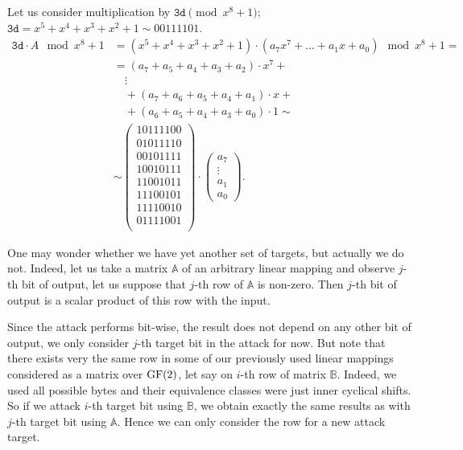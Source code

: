 \begin{example}
\label{ex:shiftmatrix}
	Let us consider multiplication by $\texttt{3d}\pmod{x^8+1}$; $\texttt{3d} = x^5+x^4+x^3+x^2+1 \sim 00111101$.
	\begin{align*}
		\texttt{3d} \cdot A \mod{x^8+1} &= (x^5+x^4+x^3+x^2+1) \cdot (a_7x^7+\ldots+a_1x+a_0) \mod{x^8+1} = \\
		&= (a_7+a_5+a_4+a_3+a_2)\cdot x^7 + ~\\
		&\quad\vdots \\
		&\quad + (a_7+a_6+a_5+a_4+a_1)\cdot x + ~\\
		&\quad + (a_6+a_5+a_4+a_3+a_0)\cdot 1 \sim \\
		&\sim
		\begin{pmatrix}
			10111100 \\
			01011110 \\
			00101111 \\
			10010111 \\
			11001011 \\
			11100101 \\
			11110010 \\
			01111001 \\
		\end{pmatrix}
		\cdot
		\begin{pmatrix}
			a_7 \\ \vdots \\ a_1 \\ a_0
		\end{pmatrix}.
	\end{align*}
\end{example}

One may wonder whether we have yet another set of targets, but actually we do not. Indeed, let us take a matrix $\mathbb{A}$ of an arbitrary linear mapping and observe $j$-th bit of output, let us suppose that $j$-th row of $\mathbb{A}$ is non-zero. Then $j$-th bit of output is a scalar product of this row with the input.

Since the attack performs bit-wise, the result does not depend on any other bit of output, we only consider $j$-th target bit in the attack for now. But note that there exists very the same row in some of our previously used linear mappings considered as a matrix over $\mathrm{GF}(2)$, let say on $i$-th row of matrix $\mathbb{B}$. Indeed, we used all possible bytes and their equivalence classes were just inner cyclical shifts. So if we attack $i$-th target bit using $\mathbb{B}$, we obtain exactly the same results as with $j$-th target bit using $\mathbb{A}$. Hence we can only consider the row for a new attack target.

